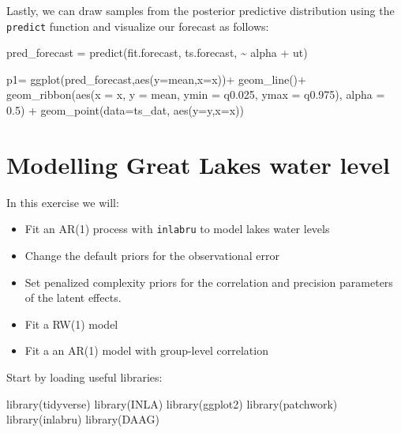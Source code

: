 \documentclass[
  letterpaper,
  DIV=11,
  numbers=noendperiod]{scrartcl}
\newenvironment{Shaded}{\begin{snugshade}}{\end{snugshade}}
\newcommand{\AttributeTok}[1]{\textcolor[rgb]{0.40,0.45,0.13}{#1}}
\newcommand{\FloatTok}[1]{\textcolor[rgb]{0.68,0.00,0.00}{#1}}
\newcommand{\FunctionTok}[1]{\textcolor[rgb]{0.28,0.35,0.67}{#1}}
\newcommand{\NormalTok}[1]{\textcolor[rgb]{0.00,0.23,0.31}{#1}}
\newcommand{\OtherTok}[1]{\textcolor[rgb]{0.00,0.23,0.31}{#1}}
\newcommand{\SpecialCharTok}[1]{\textcolor[rgb]{0.37,0.37,0.37}{#1}}
\begin{document}
Lastly, we can draw samples from the posterior predictive distribution
using the \texttt{predict} function and visualize our forecast as
follows:

\begin{Shaded}
\begin{Highlighting}[]
\NormalTok{pred\_forecast }\OtherTok{=} \FunctionTok{predict}\NormalTok{(fit.forecast, ts.forecast, }\SpecialCharTok{\textasciitilde{}}\NormalTok{ alpha }\SpecialCharTok{+}\NormalTok{ ut)}

\NormalTok{p1}\OtherTok{=} \FunctionTok{ggplot}\NormalTok{(pred\_forecast,}\FunctionTok{aes}\NormalTok{(}\AttributeTok{y=}\NormalTok{mean,}\AttributeTok{x=}\NormalTok{x))}\SpecialCharTok{+}
  \FunctionTok{geom\_line}\NormalTok{()}\SpecialCharTok{+}
    \FunctionTok{geom\_ribbon}\NormalTok{(}\FunctionTok{aes}\NormalTok{(}\AttributeTok{x =}\NormalTok{ x, }\AttributeTok{y =}\NormalTok{ mean, }\AttributeTok{ymin =}\NormalTok{ q0}\FloatTok{.025}\NormalTok{, }\AttributeTok{ymax =}\NormalTok{ q0}\FloatTok{.975}\NormalTok{),}
                \AttributeTok{alpha =} \FloatTok{0.5}\NormalTok{) }\SpecialCharTok{+}
  \FunctionTok{geom\_point}\NormalTok{(}\AttributeTok{data=}\NormalTok{ts\_dat, }\FunctionTok{aes}\NormalTok{(}\AttributeTok{y=}\NormalTok{y,}\AttributeTok{x=}\NormalTok{x))}
\end{Highlighting}
\end{Shaded}

\section{Modelling Great Lakes water
level}\label{modelling-great-lakes-water-level}

In this exercise we will:

\begin{itemize}
\item
  Fit an AR(1) process with \texttt{inlabru} to model lakes water levels
\item
  Change the default priors for the observational error
\item
  Set penalized complexity priors for the correlation and precision
  parameters of the latent effects.
\item
  Fit a RW(1) model
\item
  Fit a an AR(1) model with group-level correlation
\end{itemize}

Start by loading useful libraries:

\begin{Shaded}
\begin{Highlighting}[]
\FunctionTok{library}\NormalTok{(tidyverse) }
\FunctionTok{library}\NormalTok{(INLA) }
\FunctionTok{library}\NormalTok{(ggplot2)}
\FunctionTok{library}\NormalTok{(patchwork) }
\FunctionTok{library}\NormalTok{(inlabru)}
\FunctionTok{library}\NormalTok{(DAAG)}
\end{Highlighting}
\end{Shaded}
\end{document}
